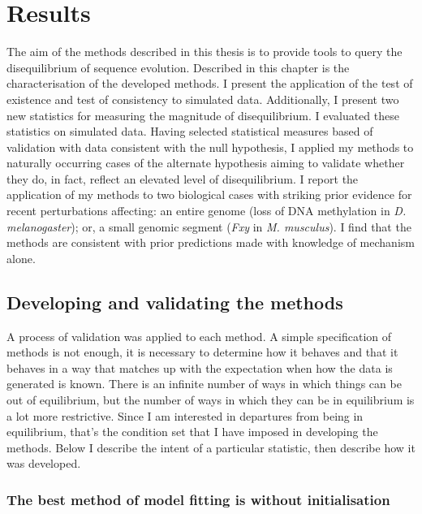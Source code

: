 \chapter{Results}


The aim of the methods described in this thesis is to provide tools to query the disequilibrium of sequence evolution. Described in this chapter is the characterisation of the developed methods. I present the application of the test of existence and test of consistency to simulated data. Additionally, I present two new statistics for measuring the magnitude of disequilibrium. I evaluated these statistics on simulated data. Having selected statistical measures based of validation with data consistent with the null hypothesis, I applied my methods to naturally occurring cases of the alternate hypothesis aiming to validate whether they do, in fact, reflect an elevated level of disequilibrium. I report the application of my methods to two biological cases with striking prior evidence for recent perturbations affecting: an entire genome (loss of DNA methylation in \textit{D. melanogaster}); or, a small genomic segment (\textit{Fxy} in \textit{M. musculus}). I find that the methods are consistent with prior predictions made with knowledge of mechanism alone.  

\section*{Developing and validating the methods}

A process of validation was applied to each method. A simple specification of methods is not enough, it is necessary to determine how it behaves and that it behaves in a way that matches up with the expectation when how the data is generated is known. There is an infinite number of ways in which things can be out of equilibrium, but the number of ways in which they can be in equilibrium is a lot more restrictive. Since I am interested in departures from being in equilibrium, that’s the condition set that I have imposed in developing the methods. Below I describe the intent of a particular statistic, then describe how it was developed.

\subsection*{The best method of model fitting is without initialisation}


